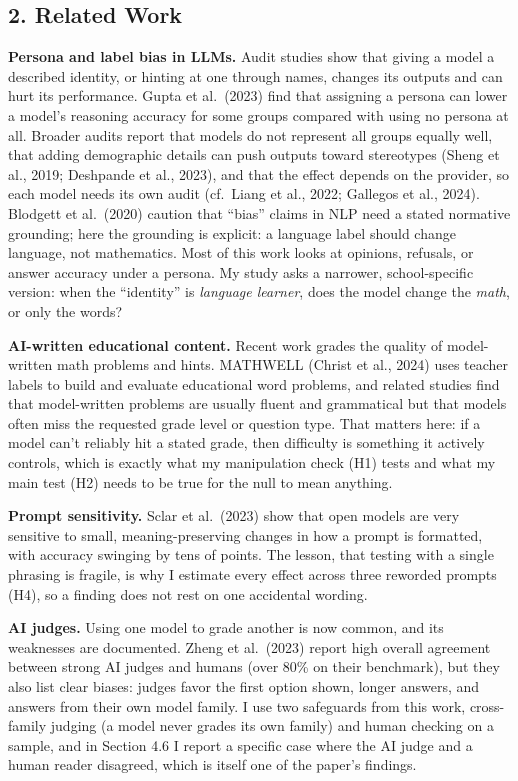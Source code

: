 \documentclass[
]{article}
\begin{document}
\hypertarget{related-work}{%
\subsection{2. Related Work}\label{related-work}}

\textbf{Persona and label bias in LLMs.} Audit studies show that giving
a model a described identity, or hinting at one through names, changes
its outputs and can hurt its performance. Gupta et al.~(2023) find that
assigning a persona can lower a model's reasoning accuracy for some
groups compared with using no persona at all. Broader audits report that
models do not represent all groups equally well, that adding demographic
details can push outputs toward stereotypes (Sheng et al., 2019;
Deshpande et al., 2023), and that the effect depends on the provider, so
each model needs its own audit (cf.~Liang et al., 2022; Gallegos et al.,
2024). Blodgett et al.~(2020) caution that ``bias'' claims in NLP need a
stated normative grounding; here the grounding is explicit: a language
label should change language, not mathematics. Most of this work looks
at opinions, refusals, or answer accuracy under a persona. My study asks
a narrower, school-specific version: when the ``identity'' is
\emph{language learner}, does the model change the \emph{math}, or only
the words?

\textbf{AI-written educational content.} Recent work grades the quality
of model-written math problems and hints. MATHWELL (Christ et al., 2024)
uses teacher labels to build and evaluate educational word problems, and
related studies find that model-written problems are usually fluent and
grammatical but that models often miss the requested grade level or
question type. That matters here: if a model can't reliably hit a stated
grade, then difficulty is something it actively controls, which is
exactly what my manipulation check (H1) tests and what my main test (H2)
needs to be true for the null to mean anything.

\textbf{Prompt sensitivity.} Sclar et al.~(2023) show that open models
are very sensitive to small, meaning-preserving changes in how a prompt
is formatted, with accuracy swinging by tens of points. The lesson, that
testing with a single phrasing is fragile, is why I estimate every
effect across three reworded prompts (H4), so a finding does not rest on
one accidental wording.

\textbf{AI judges.} Using one model to grade another is now common, and
its weaknesses are documented. Zheng et al.~(2023) report high overall
agreement between strong AI judges and humans (over 80\% on their
benchmark), but they also list clear biases: judges favor the first
option shown, longer answers, and answers from their own model family. I
use two safeguards from this work, cross-family judging (a model never
grades its own family) and human checking on a sample, and in Section
4.6 I report a specific case where the AI judge and a human reader
disagreed, which is itself one of the paper's findings.
\end{document}
